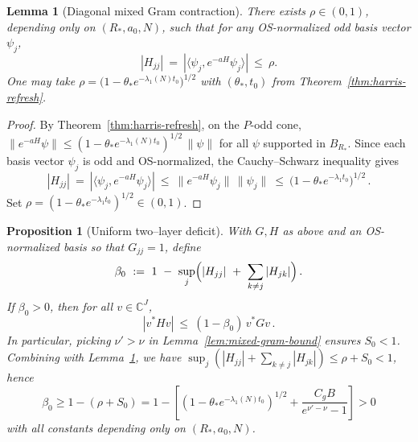 \documentclass[11pt]{amsart}
\theoremstyle{plain}
\newtheorem{lemma}[theorem]{Lemma}
\newtheorem{proposition}[theorem]{Proposition}
\theoremstyle{definition}
\theoremstyle{remark}
\begin{document}
\begin{lemma}[Diagonal mixed Gram contraction]\label{lem:diag-mixed-bound}
There exists $\rho\in(0,1)$, depending only on $(R_*,a_0,N)$, such that for any OS-normalized odd basis vector $\psi_j$,
\[
  |H_{jj}|\ =\ |\langle\psi_j, e^{-aH}\psi_j\rangle|\ \le\ \rho.
\]
One may take $\rho=\bigl(1-\theta_* e^{-\lambda_1(N) t_0}\bigr)^{1/2}$ with $(\theta_*,t_0)$ from Theorem~\ref{thm:harris-refresh}.
\end{lemma}

\begin{proof}
By Theorem~\ref{thm:harris-refresh}, on the $P$-odd cone, $\|e^{-aH}\psi\|\le (1-\theta_* e^{-\lambda_1(N) t_0})^{1/2}\,\|\psi\|$ for all $\psi$ supported in $B_{R_*}$. Since each basis vector $\psi_j$ is odd and OS-normalized, the Cauchy–Schwarz inequality gives
\[
  |H_{jj}|\ =\ |\langle\psi_j, e^{-aH}\psi_j\rangle|\ \le\ \|e^{-aH}\psi_j\|\,\|\psi_j\|\ \le\ \bigl(1-\theta_* e^{-\lambda_1 t_0}\bigr)^{1/2}\,.
\]
Set $\rho=(1-\theta_* e^{-\lambda_1 t_0})^{1/2}\in(0,1)$.
\end{proof}

\begin{proposition}[Uniform two--layer deficit]\label{prop:two-layer-deficit}
With $G,H$ as above and an OS-normalized basis so that $G_{jj}=1$, define
\[
  \beta_0\ :=\ 1\ -\ \sup_j\Bigl(|H_{jj}|\ +\ \sum_{k\ne j}|H_{jk}|\Bigr)\,.
\]
If $\beta_0>0$, then for all $v\in\mathbb C^{J}$,
\[
  |v^* H v|\ \le\ (1-\beta_0)\, v^* G v\,.
\]
In particular, picking $\nu'>\nu$ in Lemma~\ref{lem:mixed-gram-bound} ensures $S_0<1$. Combining with Lemma~\ref{lem:diag-mixed-bound}, we have $\sup_j(|H_{jj}|+\sum_{k\ne j}|H_{jk}|)\le \rho+S_0<1$, hence 
\[
  \beta_0 \ge 1-(\rho+S_0) = 1 - \left[(1-\theta_* e^{-\lambda_1(N) t_0})^{1/2} + \frac{C_g B}{e^{\nu'-\nu}-1}\right] > 0
\]
with all constants depending only on $(R_*,a_0,N)$.
\end{proposition}
\end{document}
